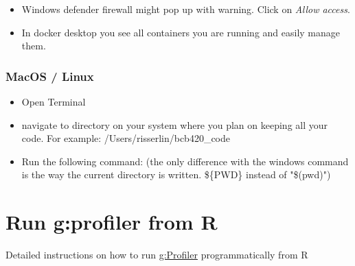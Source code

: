 \documentclass[
]{book}
\newenvironment{Shaded}{\begin{snugshade}}{\end{snugshade}}
\newcommand{\DecValTok}[1]{\textcolor[rgb]{0.00,0.00,0.81}{#1}}
\newcommand{\ErrorTok}[1]{\textcolor[rgb]{0.64,0.00,0.00}{\textbf{#1}}}
\newcommand{\NormalTok}[1]{#1}
\newcommand{\OtherTok}[1]{\textcolor[rgb]{0.56,0.35,0.01}{#1}}
\newcommand{\SpecialCharTok}[1]{\textcolor[rgb]{0.00,0.00,0.00}{#1}}
\newcommand{\StringTok}[1]{\textcolor[rgb]{0.31,0.60,0.02}{#1}}
\providecommand{\tightlist}{%
  \setlength{\itemsep}{0pt}\setlength{\parskip}{0pt}}
\begin{document}
\begin{itemize}
\tightlist
\item
  Windows defender firewall might pop up with warning. Click on \emph{Allow access}.
\item
  In docker desktop you see all containers you are running and easily manage them.
\end{itemize}

\hypertarget{macos-linux}{%
\subsection{MacOS / Linux}\label{macos-linux}}

\begin{itemize}
\tightlist
\item
  Open Terminal
\item
  navigate to directory on your system where you plan on keeping all your code. For example: /Users/risserlin/bcb420\_code
\item
  Run the following command: (the only difference with the windows command is the way the current directory is written. \$\{PWD\} instead of "\$(pwd)")
\end{itemize}

\begin{Shaded}
\end{Shaded}

\hypertarget{run-gprofiler-from-r}{%
\chapter{Run g:profiler from R}\label{run-gprofiler-from-r}}

Detailed instructions on how to run \href{https://biit.cs.ut.ee/gprofiler/gost}{g:Profiler} programmatically from R
\end{document}
